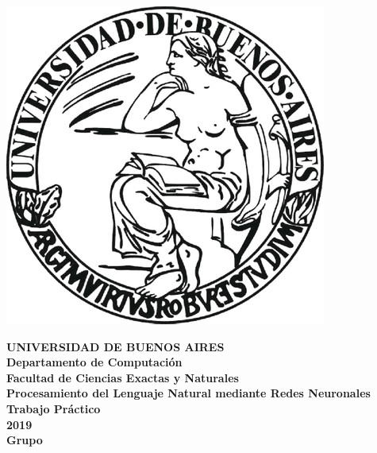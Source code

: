 
\def\Materia{Procesamiento del Lenguaje Natural mediante Redes Neuronales}
\def\Titulo{Trabajo Pr\'{a}ctico}
\def\Fecha{2019}


\thispagestyle{empty}

\begin{center}
	\includegraphics[scale = 0.25, bb=0 0 400 400]{imagenes/logo_uba.jpg}
\end{center}

\vspace{5mm}

\begin{center}
	{\textbf{\large UNIVERSIDAD DE BUENOS AIRES}}\\[1.5em]
	{\textbf{\large Departamento de Computaci\'{o}n}}\\[1.5em]
    {\textbf{\large Facultad de Ciencias Exactas y Naturales}}\\
    \vspace{35mm}
    {\LARGE\textbf{\Materia}}\\[1em]    
    \vspace{15mm}
    {\Large \textbf{\Titulo}}\\[1em]
    \vspace{15mm}
    {\textbf{\Large \Fecha}}\\
    \vspace{15mm}
    {\textbf{\Large Grupo \Grupo}}\\
    \vspace{10mm}
    \textbf{\tablaints}
\end{center}